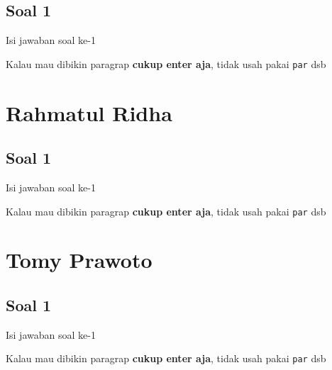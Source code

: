\subsection{Soal 1}
Isi jawaban soal ke-1

Kalau mau dibikin paragrap \textbf{cukup enter aja}, tidak usah pakai \verb|par| dsb



\section{Rahmatul Ridha}
\subsection{Soal 1}
Isi jawaban soal ke-1

Kalau mau dibikin paragrap \textbf{cukup enter aja}, tidak usah pakai \verb|par| dsb



\section{Tomy Prawoto}
\subsection{Soal 1}
Isi jawaban soal ke-1

Kalau mau dibikin paragrap \textbf{cukup enter aja}, tidak usah pakai \verb|par| dsb


